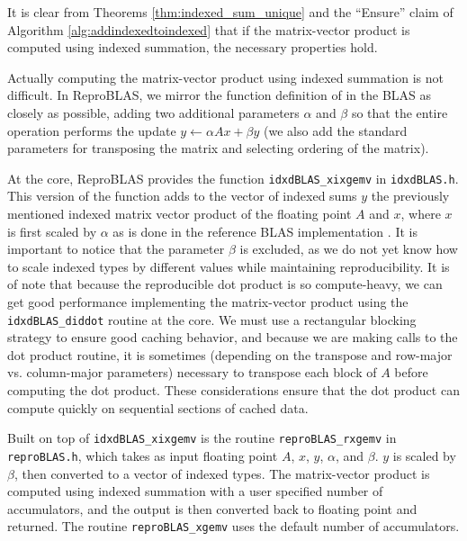   It is clear from Theorems \ref{thm:indexed_sum_unique} and the ``Ensure'' claim of Algorithm \ref{alg:addindexedtoindexed} that if the matrix-vector product is computed using indexed summation, the necessary properties hold.

  Actually computing the matrix-vector product using indexed summation is not difficult. In ReproBLAS, we mirror the function definition of  in the BLAS as closely as possible, adding two additional parameters $\alpha$ and $\beta$ so that the entire operation performs the update $y \gets \alpha Ax + \beta y$ (we also add the standard parameters for transposing the matrix and selecting ordering of the matrix).

  At the core, ReproBLAS provides the function \texttt{idxdBLAS\_xixgemv} in \texttt{idxdBLAS.h}. This version of the function adds to the vector of indexed sums $y$ the previously mentioned indexed matrix vector product of the floating point $A$ and $x$, where $x$ is first scaled by $\alpha$ as is done in the reference BLAS implementation \cite{netlib}. It is important to notice that the parameter $\beta$ is excluded, as we do not yet know how to scale indexed types by different values while maintaining reproducibility.
  It is of note that because the reproducible dot product is so compute-heavy, we can get good performance implementing the matrix-vector product using the \texttt{idxdBLAS\_diddot} routine at the core. We must use a rectangular blocking strategy to ensure good caching behavior, and because we are making calls to the dot product routine, it is sometimes (depending on the transpose and row-major vs. column-major parameters) necessary to transpose each block of $A$ before computing the dot product. These considerations ensure that the dot product can compute quickly on sequential sections of cached data.

  Built on top of \texttt{idxdBLAS\_xixgemv} is the routine \texttt{reproBLAS\_rxgemv} in \texttt{reproBLAS.h}, which takes as input floating point $A$, $x$, $y$, $\alpha$, and $\beta$. $y$ is scaled by $\beta$, then converted to a vector of indexed types. The matrix-vector product is computed using indexed summation with a user specified number of accumulators, and the output is then converted back to floating point and returned. The routine \texttt{reproBLAS\_xgemv} uses the default number of accumulators.
